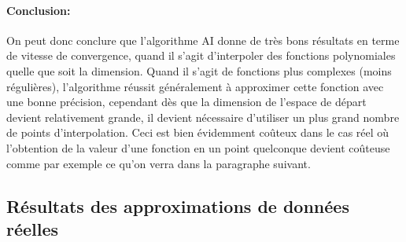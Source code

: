 \paragraph{Conclusion:\\}
\hspace{0.5cm} On peut donc conclure que l'algorithme AI donne de très bons résultats en terme de vitesse de convergence, quand il s'agit d'interpoler des fonctions polynomiales quelle que soit la dimension. Quand il s'agit de fonctions plus complexes (moins régulières), l'algorithme réussit généralement à approximer cette fonction avec une bonne précision, cependant dès que la dimension de l'espace de départ devient relativement grande, il devient nécessaire d'utiliser un plus grand nombre de points d'interpolation. Ceci est bien évidemment coûteux dans le cas réel où l'obtention de la valeur d'une fonction en un point quelconque devient coûteuse comme par exemple ce qu'on verra dans la paragraphe suivant.
\newpage


\subsection{Résultats des approximations de données réelles}
